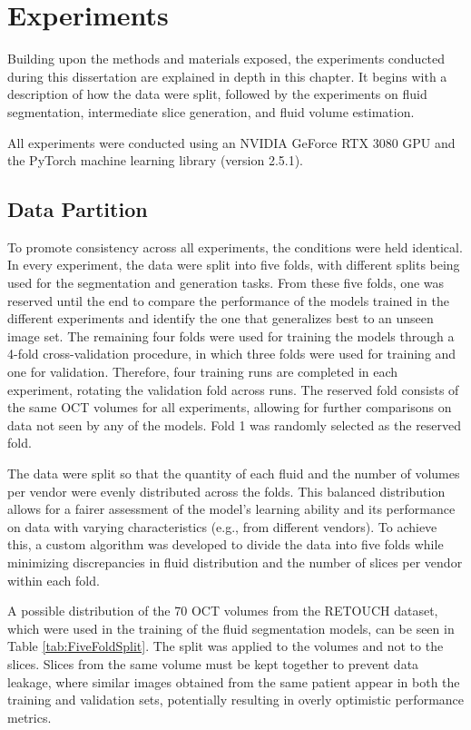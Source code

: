\chapter{Experiments}\label{Experiments}
Building upon the methods and materials exposed, the experiments conducted during this dissertation are explained in depth in this chapter. It begins with a description of how the data were split, followed by the experiments on fluid segmentation, intermediate slice generation, and fluid volume estimation.
\par
All experiments were conducted using an NVIDIA GeForce RTX 3080 GPU and the \hbox{PyTorch} machine learning library (version 2.5.1).

\section{Data Partition}\label{CrossValidation}
To promote consistency across all experiments, the conditions were held identical. In every experiment, the data were split into five folds, with different splits being used for the segmentation and generation tasks. From these five folds, one was reserved until the end to compare the performance of the models trained in the different experiments and identify the one that generalizes best to an unseen image set. The remaining four folds were used for training the models through a 4-fold cross-validation procedure, in which three folds were used for training and one for validation. Therefore, four training runs are completed in each experiment, rotating the validation fold across runs. The reserved fold consists of the same OCT volumes for all experiments, allowing for further comparisons on data not seen by any of the models. Fold 1 was randomly selected as the reserved fold.
\par
The data were split so that the quantity of each fluid and the number of volumes per vendor were evenly distributed across the folds. This balanced distribution allows for a fairer assessment of the model's learning ability and its performance on data with varying characteristics (e.g., from different vendors). To achieve this, a custom algorithm was developed to divide the data into five folds while minimizing discrepancies in fluid distribution and the number of slices per vendor within each fold.
\par
A possible distribution of the 70 OCT volumes from the RETOUCH dataset, which were used in the training of the fluid segmentation models, can be seen in Table \ref{tab:FiveFoldSplit}. The split was applied to the volumes and not to the slices. Slices from the same volume must be kept together to prevent data leakage, where similar images obtained from the same patient appear in both the training and validation sets, potentially resulting in overly optimistic performance metrics.

